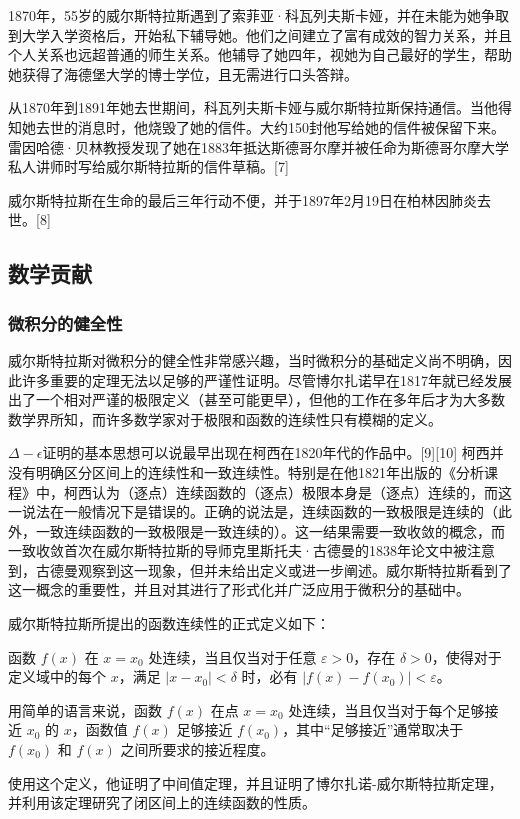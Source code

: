 1870年，55岁的威尔斯特拉斯遇到了索菲亚·科瓦列夫斯卡娅，并在未能为她争取到大学入学资格后，开始私下辅导她。他们之间建立了富有成效的智力关系，并且个人关系也远超普通的师生关系。他辅导了她四年，视她为自己最好的学生，帮助她获得了海德堡大学的博士学位，且无需进行口头答辩。

从1870年到1891年她去世期间，科瓦列夫斯卡娅与威尔斯特拉斯保持通信。当他得知她去世的消息时，他烧毁了她的信件。大约150封他写给她的信件被保留下来。雷因哈德·贝林教授发现了她在1883年抵达斯德哥尔摩并被任命为斯德哥尔摩大学私人讲师时写给威尔斯特拉斯的信件草稿。[7]

威尔斯特拉斯在生命的最后三年行动不便，并于1897年2月19日在柏林因肺炎去世。[8]
\subsection{数学贡献}
\subsubsection{微积分的健全性}  
威尔斯特拉斯对微积分的健全性非常感兴趣，当时微积分的基础定义尚不明确，因此许多重要的定理无法以足够的严谨性证明。尽管博尔扎诺早在1817年就已经发展出了一个相对严谨的极限定义（甚至可能更早），但他的工作在多年后才为大多数数学界所知，而许多数学家对于极限和函数的连续性只有模糊的定义。

\(\Delta-\epsilon\)证明的基本思想可以说最早出现在柯西在1820年代的作品中。[9][10] 柯西并没有明确区分区间上的连续性和一致连续性。特别是在他1821年出版的《分析课程》中，柯西认为（逐点）连续函数的（逐点）极限本身是（逐点）连续的，而这一说法在一般情况下是错误的。正确的说法是，连续函数的一致极限是连续的（此外，一致连续函数的一致极限是一致连续的）。这一结果需要一致收敛的概念，而一致收敛首次在威尔斯特拉斯的导师克里斯托夫·古德曼的1838年论文中被注意到，古德曼观察到这一现象，但并未给出定义或进一步阐述。威尔斯特拉斯看到了这一概念的重要性，并且对其进行了形式化并广泛应用于微积分的基础中。

威尔斯特拉斯所提出的函数连续性的正式定义如下：

函数 \( f(x) \) 在 \( x = x_0 \) 处连续，当且仅当对于任意 \( \varepsilon > 0 \)，存在 \( \delta > 0 \)，使得对于定义域中的每个 \( x \)，满足 \( |x - x_0| < \delta \) 时，必有 \( |f(x) - f(x_0)| < \varepsilon \)。

用简单的语言来说，函数 \( f(x) \) 在点 \( x = x_0 \) 处连续，当且仅当对于每个足够接近 \( x_0 \) 的 \( x \)，函数值 \( f(x) \) 足够接近 \( f(x_0) \)，其中“足够接近”通常取决于 \( f(x_0) \) 和 \( f(x) \) 之间所要求的接近程度。

使用这个定义，他证明了中间值定理，并且证明了博尔扎诺-威尔斯特拉斯定理，并利用该定理研究了闭区间上的连续函数的性质。